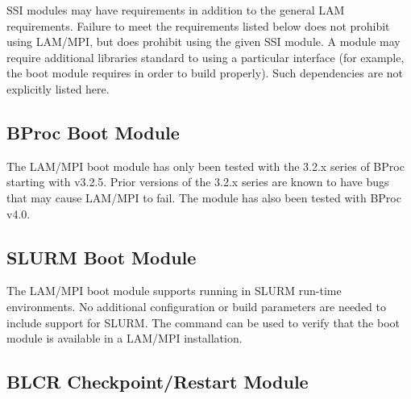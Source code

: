 SSI modules may have requirements in addition to the general LAM
requirements.  Failure to meet the requirements listed below does not
prohibit using LAM/MPI, but does prohibit using the given SSI module.
A module may require additional libraries standard to using a
particular interface (for example, the  boot module
requires  in order to build properly).  Such
dependencies are not explicitly listed here.


\subsection{BProc Boot Module}



The LAM/MPI  boot module has only been tested with the
3.2.x series of BProc starting with v3.2.5.  Prior versions of the
3.2.x series are known to have bugs that may cause LAM/MPI to fail.
The  module has also been tested with BProc v4.0.



\subsection{SLURM Boot Module}



The LAM/MPI  boot module supports running in SLURM
run-time environments.  No additional configuration or build
parameters are needed to include support for SLURM.  The 
command can be used to verify that the  boot module is
available in a LAM/MPI installation.



\subsection{BLCR Checkpoint/Restart Module}

